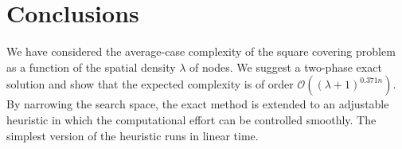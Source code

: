 \documentclass{article}
\begin{document}
\section{Conclusions}
We have considered the average-case complexity of the square covering problem 
as a function of the spatial density $\lambda$ of nodes.
We suggest a two-phase exact solution and show that the expected complexity 
is of order $\mathcal{O}((\lambda+1)^{0.371 n})$.
By narrowing the search space, the exact method is extended to an adjustable 
heuristic in which the computational effort can be controlled smoothly. The 
simplest version of the heuristic runs in linear time.
\end{document}
